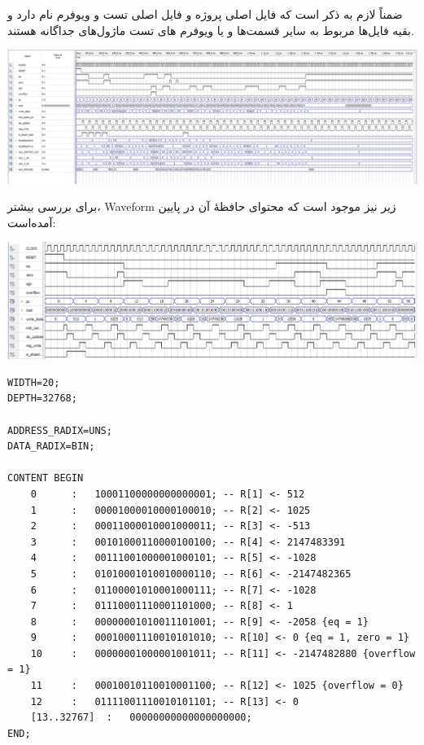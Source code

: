 \documentclass[12pt,titlepage,a4page , tikz , multi,table , svgnames,xcdraw]{article}
\begin{document}
ضمناً لازم به ذکر است که فایل اصلی پروژه  و فایل اصلی تست و ویوفرم  نام دارد و بقیه فایل‌ها مربوط به سایر قسمت‌ها و یا ویوفرم های تست ماژول‌های جداگانه هستند.


\begin{center}
\includegraphics[width=\textwidth]{Waveform.png}
\end{center}
برای بررسی بیشتر، Waveform زیر نیز  موجود است که محتوای حافظهٔ آن در پایین آمده‌است:
\begin{center}
\includegraphics[width=\textwidth]{CPU.png}
\end{center}
\begin{latin}
\begin{verbatim}
WIDTH=20;
DEPTH=32768;

ADDRESS_RADIX=UNS;
DATA_RADIX=BIN;

CONTENT BEGIN
	0      :   10001100000000000001; -- R[1] <- 512
	1      :   00001000010000100010; -- R[2] <- 1025
	2      :   00011000010001000011; -- R[3] <- -513
	3      :   00101000110000100100; -- R[4] <- 2147483391
	4      :   00111001000001000101; -- R[5] <- -1028
	5      :   01010001010010000110; -- R[6] <- -2147482365
	6      :   01100001010001000111; -- R[7] <- -1028
	7      :   01110001110001101000; -- R[8] <- 1
	8      :   00000001010011101001; -- R[9] <- -2058 {eq = 1}
	9      :   00010001110010101010; -- R[10] <- 0 {eq = 1, zero = 1}
	10     :   00000001000001001011; -- R[11] <- -2147482880 {overflow = 1}
	11     :   00010010110010001100; -- R[12] <- 1025 {overflow = 0}
	12     :   01111001110010101101; -- R[13] <- 0
	[13..32767]  :   00000000000000000000;
END;

\end{verbatim} 
\end{latin}
\end{document}
